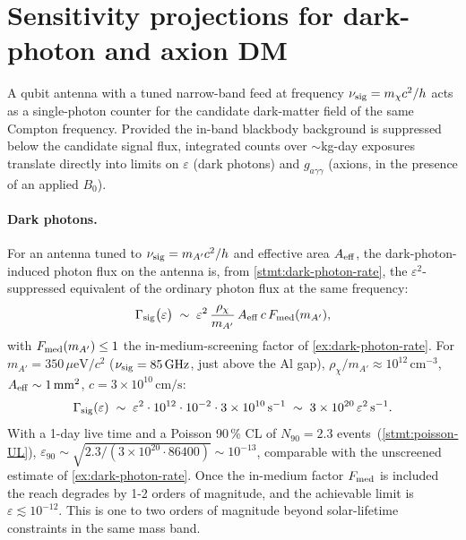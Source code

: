 \section{Sensitivity projections for dark-photon and axion DM}
\label{sec:antenna-sensitivity}

\begin{phenomenon}
A qubit antenna with a tuned narrow-band feed at frequency
$\nu_{\rm sig}=m_\chi c^2/h$ acts as a single-photon counter for
the candidate dark-matter field of the same Compton frequency.
Provided the in-band blackbody background is suppressed below
the candidate signal flux, integrated counts over
$\sim$kg-day exposures translate directly into limits on
$\varepsilon$ (dark photons) and $g_{a\gamma\gamma}$ (axions, in
the presence of an applied $B_0$).
\end{phenomenon}

\paragraph{Dark photons.}
For an antenna tuned to $\nu_{\rm sig}=m_{A'}c^2/h$ and effective
area $A_{\rm eff}$, the dark-photon-induced photon flux on the
antenna is, from \cref{stmt:dark-photon-rate}, the
$\varepsilon^2$-suppressed equivalent of the ordinary photon
flux at the same frequency:
\begin{equation}
\Gamma_{\rm sig}\bigl(\varepsilon\bigr)
\;\sim\; \varepsilon^2\,\frac{\rho_\chi}{m_{A'}}\,
A_{\rm eff}\,c\,F_{\rm med}(m_{A'}),
\end{equation}
with $F_{\rm med}(m_{A'})\leq 1$ the in-medium-screening factor of
\cref{ex:dark-photon-rate}. For $m_{A'}=350\,\mu\text{eV}/c^2$
($\nu_{\rm sig}=85\,\text{GHz}$, just above the Al gap),
$\rho_\chi/m_{A'}\approx 10^{12}\,\text{cm}^{-3}$, $A_{\rm eff}\sim
1\,\text{mm}^2$, $c=3\times 10^{10}\,\text{cm}/\text{s}$:
\begin{equation}
\Gamma_{\rm sig}(\varepsilon)
\;\sim\; \varepsilon^2 \cdot 10^{12} \cdot 10^{-2}\cdot 3\times 10^{10}\,\text{s}^{-1}
\;\sim\; 3\times 10^{20}\,\varepsilon^2\,\text{s}^{-1}.
\end{equation}
With a 1-day live time and a Poisson 90\,\% CL of
$N_{90}=2.3$ events~(\cref{stmt:poisson-UL}),
$\varepsilon_{90}\sim\sqrt{2.3/(3\times 10^{20}\cdot 86400)}
\sim 10^{-13}$, comparable with the unscreened
estimate of \cref{ex:dark-photon-rate}. Once the in-medium factor
$F_{\rm med}$ is included the reach degrades by 1-2 orders of
magnitude, and the achievable limit is
$\varepsilon\lesssim 10^{-12}$. This is one to two orders of
magnitude beyond solar-lifetime constraints in the same mass
band.

